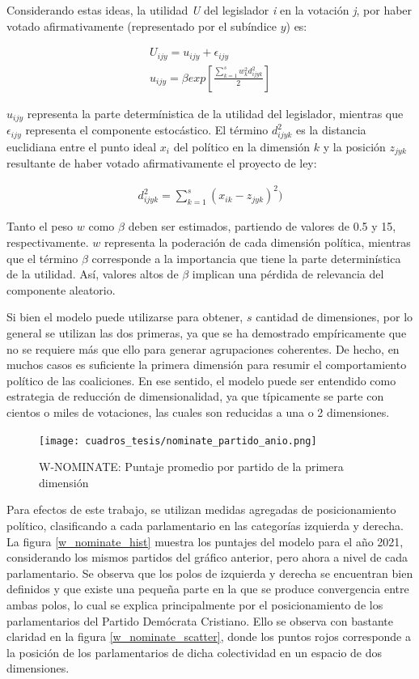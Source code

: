\documentclass[
  12pt,
]{article}
\begin{document}
Considerando estas ideas, la utilidad \emph{U} del legislador \emph{i}
en la votación \emph{j}, por haber votado afirmativamente (representado
por el subíndice \(y\)) es:

\begin{align}
\label{formula_poole}
U_{ijy} = u_{ijy} + \epsilon_{ijy} \\
u_{ijy} = \beta exp[\frac{\sum_{k=1}^{s}w_{k}^2d_{ijyk}^2 }{2}] 
\end{align}

\(u_{ijy}\) representa la parte determínistica de la utilidad del
legislador, mientras que \(\epsilon_{ijy}\) representa el componente
estocástico. El término \(d_{ijyk}^2\) es la distancia euclidiana entre
el punto ideal \(x_i\) del político en la dimensión \(k\) y la posición
\(z_{jyk}\) resultante de haber votado afirmativamente el proyecto de
ley:

\begin{align}
\label{formula_distancia}
d_{ijyk}^2 = \sum_{k=1}^{s}(x_{ik} - z_{jyk})^2)
\end{align}

Tanto el peso \(w\) como \(\beta\) deben ser estimados, partiendo de
valores de 0.5 y 15, respectivamente. \(w\) representa la poderación de
cada dimensión política, mientras que el término \(\beta\) corresponde a
la importancia que tiene la parte determinística de la utilidad. Así,
valores altos de \(\beta\) implican una pérdida de relevancia del
componente aleatorio.

Si bien el modelo puede utilizarse para obtener, \(s\) cantidad de
dimensiones, por lo general se utilizan las dos primeras, ya que se ha
demostrado empíricamente que no se requiere más que ello para generar
agrupaciones coherentes. De hecho, en muchos casos es suficiente la
primera dimensión para resumir el comportamiento político de las
coaliciones. En ese sentido, el modelo puede ser entendido como
estrategia de reducción de dimensionalidad, ya que típicamente se parte
con cientos o miles de votaciones, las cuales son reducidas a una o 2
dimensiones.

\begin{figure}[H]
\centering
\large
\caption{W-NOMINATE: Puntaje promedio por partido de la primera dimensión}
\label{w_nominate_plot}
\texttt{[image: cuadros\_tesis/nominate\_partido\_anio.png]}
\normalsize
\end{figure}

Para efectos de este trabajo, se utilizan medidas agregadas de
posicionamiento político, clasificando a cada parlamentario en las
categorías izquierda y derecha. La figura \ref{w_nominate_hist} muestra
los puntajes del modelo para el año 2021, considerando los mismos
partidos del gráfico anterior, pero ahora a nivel de cada parlamentario.
Se observa que los polos de izquierda y derecha se encuentran bien
definidos y que existe una pequeña parte en la que se produce
convergencia entre ambas polos, lo cual se explica principalmente por el
posicionamiento de los parlamentarios del Partido Demócrata Cristiano.
Ello se observa con bastante claridad en la figura
\ref{w_nominate_scatter}, donde los puntos rojos corresponde a la
posición de los parlamentarios de dicha colectividad en un espacio de
dos dimensiones.
\end{document}

